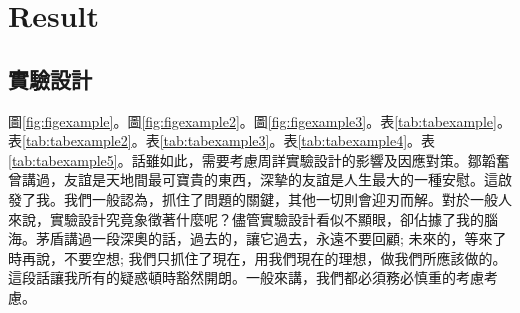 
\chapter{Result}\label{sec:evalutaion}

\section{實驗設計}

圖\ref{fig:figexample}。圖\ref{fig:figexample2}。圖\ref{fig:figexample3}。表\ref{tab:tabexample}。表\ref{tab:tabexample2}。表\ref{tab:tabexample3}。表\ref{tab:tabexample4}。表\ref{tab:tabexample5}。話雖如此，需要考慮周詳實驗設計的影響及因應對策。鄒韜奮曾講過，友誼是天地間最可寶貴的東西，深摯的友誼是人生最大的一種安慰。這啟發了我。我們一般認為，抓住了問題的關鍵，其他一切則會迎刃而解。對於一般人來說，實驗設計究竟象徵著什麼呢？儘管實驗設計看似不顯眼，卻佔據了我的腦海。茅盾講過一段深奧的話，過去的，讓它過去，永遠不要回顧; 未來的，等來了時再說，不要空想; 我們只抓住了現在，用我們現在的理想，做我們所應該做的。這段話讓我所有的疑惑頓時豁然開朗。一般來講，我們都必須務必慎重的考慮考慮。

